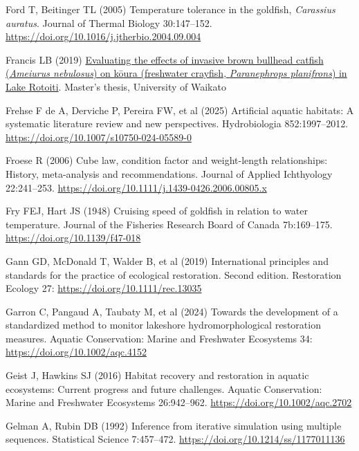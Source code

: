 \documentclass[
  12pt,
  a4paper,
  oneside]{scrbook}
\newlength{\cslhangindent}
\newenvironment{CSLReferences}[2] %
 {\begin{list}{}{%
  \setlength{\itemindent}{0pt}
  \setlength{\leftmargin}{0pt}
  \setlength{\parsep}{0pt}
  \ifodd #1
   \setlength{\leftmargin}{\cslhangindent}
   \setlength{\itemindent}{-1\cslhangindent}
  \fi
  \setlength{\itemsep}{#2\baselineskip}}}
 {\end{list}}
\begin{document}
\begin{CSLReferences}{1}{1}
Ford T, Beitinger TL (2005) Temperature tolerance in the goldfish,
{\emph{Carassius auratus}}. Journal of Thermal Biology 30:147--152.
\url{https://doi.org/10.1016/j.jtherbio.2004.09.004}

Francis LB (2019)
\href{https://researchcommons.waikato.ac.nz/handle/10289/12746}{Evaluating
the effects of invasive brown bullhead catfish ({\emph{Ameiurus
nebulosus}}) on k{ō}ura (freshwater crayfish, {\emph{Paranephrops
planifrons}}) in {Lake Rotoiti}}. Master's thesis, University of Waikato

Frehse F de A, Derviche P, Pereira FW, et al (2025) Artificial aquatic
habitats: A systematic literature review and new perspectives.
Hydrobiologia 852:1997--2012.
\url{https://doi.org/10.1007/s10750-024-05589-0}

Froese R (2006) Cube law, condition factor and weight-length
relationships: History, meta-analysis and recommendations. Journal of
Applied Ichthyology 22:241--253.
\url{https://doi.org/10.1111/j.1439-0426.2006.00805.x}

Fry FEJ, Hart JS (1948) Cruising speed of goldfish in relation to water
temperature. Journal of the Fisheries Research Board of Canada
7b:169--175. \url{https://doi.org/10.1139/f47-018}

Gann GD, McDonald T, Walder B, et al (2019) International principles and
standards for the practice of ecological restoration. {Second edition}.
Restoration Ecology 27: \url{https://doi.org/10.1111/rec.13035}

Garron C, Pangaud A, Taubaty M, et al (2024) Towards the development of
a standardized method to monitor lakeshore hydromorphological
restoration measures. Aquatic Conservation: Marine and Freshwater
Ecosystems 34: \url{https://doi.org/10.1002/aqc.4152}

Geist J, Hawkins SJ (2016) Habitat recovery and restoration in aquatic
ecosystems: Current progress and future challenges. Aquatic
Conservation: Marine and Freshwater Ecosystems 26:942--962.
\url{https://doi.org/10.1002/aqc.2702}

Gelman A, Rubin DB (1992) Inference from iterative simulation using
multiple sequences. Statistical Science 7:457--472.
\url{https://doi.org/10.1214/ss/1177011136}


\end{CSLReferences}
\end{document}
